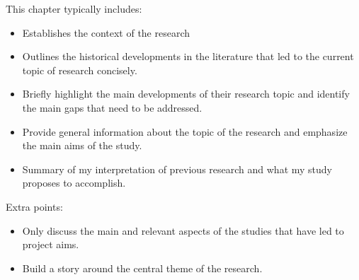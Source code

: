 

{\color{orange} This chapter typically includes: }

\begin{itemize}
    \item Establishes the context of the research
    \item Outlines the historical developments in the literature that led to the current topic of research concisely.
    \item Briefly highlight the main developments of their research topic and identify the main gaps that need to be addressed.
    \item Provide general information about the topic of the research and emphasize the main aims of the study. 
    \item Summary of my interpretation of previous research and what my study proposes to accomplish.
\end{itemize}


{\color{orange}Extra points:}
\begin{itemize}

    \item Only discuss the main and relevant aspects of the studies that have led to project aims.
    \item Build a story around the central theme of the research.

\end{itemize}

